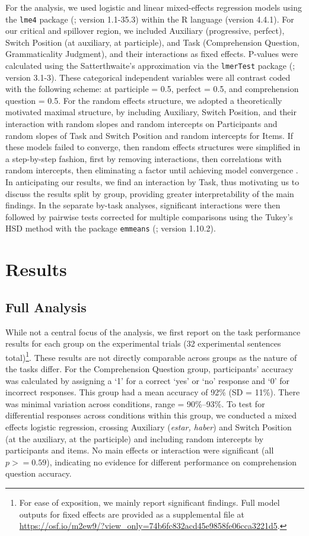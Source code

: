 \documentclass[output=paper,colorlinks,citecolor=brown]{langscibook}
\begin{document}
For the analysis, we used logistic and linear mixed-effects regression models using the \texttt{lme4} package (\cite{Batesetal2015}; version 1.1-35.3) within the R language (version 4.4.1). For our critical and spillover region, we included Auxiliary (progressive, perfect), Switch Position (at auxiliary, at participle), and Task (Comprehension Question, Grammaticality Judgment), and their interactions as fixed effects. P-values were calculated using the Satterthwaite’s approximation via the \texttt{lmerTest} package (\cite{Kuznetsovaetal2017}; version 3.1-3). These categorical independent variables were all contrast coded with the following scheme: at participle = 0.5, perfect = 0.5, and comprehension question = 0.5. For the random effects structure, we adopted a theoretically motivated maximal structure, by including Auxiliary, Switch Position, and their interaction with random slopes and random intercepts on Participants and random slopes of Task and Switch Position and random intercepts for Items. If these models failed to converge, then random effects structures were simplified in a step-by-step fashion, first by removing interactions, then correlations with random intercepts, then eliminating a factor until achieving model convergence \citep{Barretal2013}. In anticipating our results, we find an interaction by Task, thus motivating us to discuss the results split by group, providing greater interpretability of the main findings. In the separate by-task analyses, significant interactions were then followed by pairwise tests corrected for multiple comparisons using the Tukey’s HSD method with the package \texttt{emmeans} (\cite{Lenth2024}; version 1.10.2).

\section{Results}
\subsection{Full Analysis}
While not a central focus of the analysis, we first report on the task performance results for each group on the experimental trials (32 experimental sentences total)\footnote{For ease of exposition, we mainly report significant findings. Full model outputs for fixed effects are provided as a supplemental file at \url{https://osf.io/m2ew9/?view_only=74b6fc832acd45e9858fe06cca3221d5}.}. These results are not directly comparable across groups as the nature of the tasks differ. For the Comprehension Question group, participants’ accuracy was calculated by assigning a `1' for a correct `yes' or `no' response and `0' for incorrect responses. This group had a mean accuracy of 92\% (SD = 11\%). There was minimal variation across conditions, range = 90\%--93\%. To test for differential responses across conditions within this group, we conducted a mixed effects logistic regression, crossing Auxiliary (\textit{estar, haber}) and Switch Position (at the auxiliary, at the participle) and including random intercepts by participants and items. No main effects or interaction were significant (all $p >= 0.59$), indicating no evidence for different performance on comprehension question accuracy.
\end{document}
